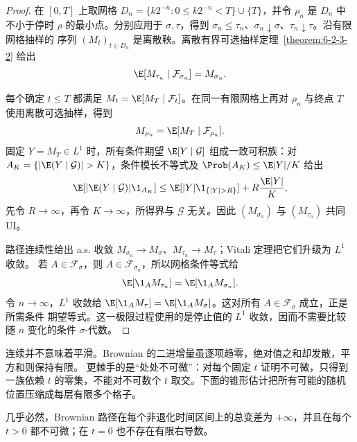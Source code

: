 \begin{proof}
在 $[0,T]$ 上取网格
$D_n=\{k2^{-n}:0\le k2^{-n}<T\}\cup\{T\}$，并令
$\rho_n$ 是 $D_n$ 中不小于停时 $\rho$ 的最小点。分别应用于 $\sigma,\tau$，得到
$\sigma_n\le\tau_n$、$\sigma_n\downarrow\sigma$、$\tau_n\downarrow\tau$。沿有限网格抽样的
序列 $(M_t)_{t\in D_n}$ 是离散鞅。离散有界可选抽样定理~\ref{theorem:6-2-3-2} 给出
\[
 \E[M_{\tau_n}\mid\mathcal F_{\sigma_n}]=M_{\sigma_n}.
\]

每个确定 $t\le T$ 都满足 $M_t=\E[M_T\mid\mathcal F_t]$。在同一有限网格上再对
$\rho_n$ 与终点 $T$ 使用离散可选抽样，得到
\[
 M_{\rho_n}=\E[M_T\mid\mathcal F_{\rho_n}].
\]
固定 $Y=M_T\in L^1$ 时，所有条件期望 $\E[Y\mid\mathcal G]$ 组成一致可积族：对
$A_K=\{|\E(Y\mid\mathcal G)|>K\}$，条件模长不等式及
$\Prob(A_K)\le\E|Y|/K$ 给出
\[
 \E[|\E(Y\mid\mathcal G)|\1_{A_K}]
 \le\E[|Y|\1_{\{|Y|>R\}}]+R\frac{\E|Y|}{K},
\]
先令 $R\to\infty$，再令 $K\to\infty$，所得界与 $\mathcal G$ 无关。因此
$(M_{\sigma_n})$ 与 $(M_{\tau_n})$ 共同 UI。

路径连续性给出 a.s. 收敛
$M_{\sigma_n}\to M_\sigma$、$M_{\tau_n}\to M_\tau$；Vitali 定理把它们升级为 $L^1$ 收敛。
若 $A\in\mathcal F_\sigma$，则 $A\in\mathcal F_{\sigma_n}$，所以网格条件等式给
\[
 \E[\1_AM_{\tau_n}]=\E[\1_AM_{\sigma_n}].
\]
令 $n\to\infty$，$L^1$ 收敛给
$\E[\1_AM_\tau]=\E[\1_AM_\sigma]$。这对所有 $A\in\mathcal F_\sigma$ 成立，正是所需条件
期望等式。这一极限过程使用的是停止值的 $L^1$ 收敛，因而不需要比较随 $n$ 变化的条件 $\sigma$-代数。
\end{proof}

连续并不意味着平滑。Brownian 的二进增量虽逐项趋零，绝对值之和却发散，平方和则保持有限。
更棘手的是“处处不可微”：对每个固定 $t$ 证明不可微，只得到一族依赖 $t$ 的零集，不能对不可数个
$t$ 取交。下面的锥形估计把所有可能的随机位置压缩成每层有限多个格子。

\begin{theorem}\label{theorem:6-4-1-4}
几乎必然，Brownian 路径在每个非退化时间区间上的总变差为 $+\infty$，并且在每个
$t>0$ 都不可微；在 $t=0$ 也不存在有限右导数。
\end{theorem}

